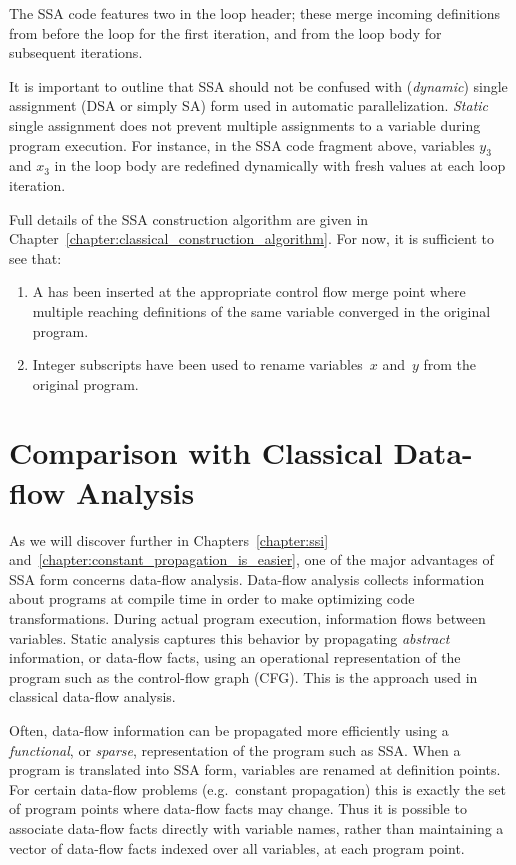 The SSA code features two \phifuns in the loop header; these merge incoming definitions from before the loop for the first iteration, and from the loop body for subsequent iterations.

It is important to outline that SSA should not be confused with (\emph{dynamic}) single assignment (DSA or simply SA) form used in automatic parallelization. 
\emph{Static} single assignment does not prevent multiple assignments to a variable during program execution. 
For instance, in the SSA code fragment above, variables $y_3$ and $x_3$ in the loop body are redefined dynamically with fresh values at each loop iteration.

Full details of the SSA construction algorithm are given in Chapter~\ref{chapter:classical_construction_algorithm}. 
For now, it is sufficient to see that: \begin{enumerate} \item A \phifun has been inserted at the appropriate control flow merge point where multiple reaching definitions of the same variable converged in the original program.
\item Integer subscripts have been used to rename variables~$x$ and~$y$ from the original program.
\end{enumerate}

\section{Comparison with Classical Data-flow Analysis} \label{sec:vanilla:dfa}
As we will discover further in Chapters~\ref{chapter:ssi} and~\ref{chapter:constant_propagation_is_easier}, one of the major advantages of SSA form concerns data-flow analysis. Data-flow analysis collects information about programs at compile time in order to make optimizing code transformations. 
During actual program execution, information flows between variables. 
Static analysis captures this behavior by propagating \textit{abstract} information, or data-flow facts, using an operational representation of the program such as the control-flow graph (CFG). 
This is the approach used in classical data-flow analysis.

Often, data-flow information can be propagated more efficiently using a \textit{functional}, or \textit{sparse}, representation of the program such as SSA. 
When a program is translated into SSA form, variables are renamed at definition points. 
For certain data-flow problems (e.g.~constant propagation) this is exactly the set of program points where data-flow facts may change. 
Thus it is possible to associate data-flow facts directly with variable names, rather than maintaining a vector of data-flow facts indexed over all variables, at each program point.

